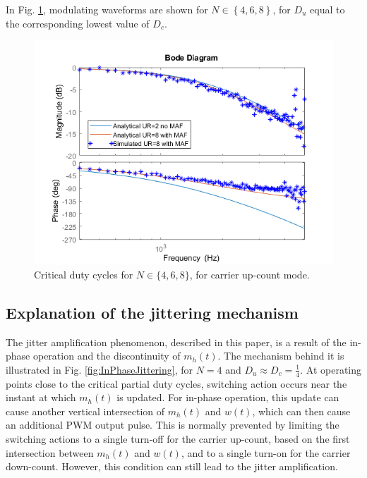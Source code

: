 \documentclass[journal]{IEEEtran}
\begin{document}
In Fig. \ref{fig:CriticalDuties}, modulating waveforms are shown for $N\in \left\lbrace 4,6,8 \right\rbrace$, for $D_u$ equal to the corresponding lowest value of $D_c$.

\begin{figure}[t!]
    \centerline{\includegraphics[width=0.95\linewidth]{figures/nas_clfra.png}}
    \caption{Critical duty cycles for $N \in \{4,6,8 \}$, for carrier up-count mode. }
    \label{fig:CriticalDuties}
\end{figure}

\subsection{Explanation of the jittering mechanism}

The jitter amplification phenomenon, described in this paper, is a result of the in-phase operation and the discontinuity of $m_h(t)$. The mechanism behind it is illustrated in Fig. \ref{fig:InPhaseJittering}, for $N = 4$ and $D_u \approx D_c = \frac{1}{4}$.
At operating points close to the critical partial duty cycles, switching action occurs near the instant at which $m_h(t)$ is updated. For in-phase operation, this update can cause another vertical intersection of $m_h(t)$ and $w(t)$, which can then cause an additional PWM output pulse. This is normally prevented by limiting the switching actions to a single turn-off for the carrier up-count, based on the first intersection between $m_h(t)$ and $w(t)$, and to a single turn-on for the carrier down-count. However, this condition can still lead to the jitter amplification.
\end{document}
